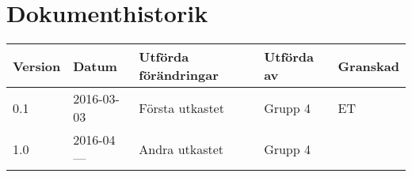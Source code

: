 \documentclass[11pt]{article}
\begin{document}
\pagebreak

\tableofcontents

\pagebreak
\section*{Dokumenthistorik}
\begin{table}[h]
\begin{tabular}{|l|l|l|l|l|} \hline

\textbf{Version} & \textbf{Datum} & \textbf{Utförda förändringar} & \textbf{Utförda av} & \textbf{Granskad} \\ \hline
0.1 & 2016-03-03 &  Första utkastet & Grupp 4 & ET \\ \hline
1.0 & 2016-04--- &  Andra utkastet & Grupp 4 & \\ \hline
\end{tabular}
\end{table}

\pagebreak
{}
\end{document}
